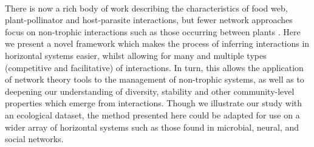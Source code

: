 \documentclass[a4,12pt]{article}
\begin{document}
    \paragraph{} 
    There is now a rich body of work describing the characteristics of food web, plant-pollinator and host-parasite interactions, but fewer network approaches focus on non-trophic interactions such as those occurring between plants \parencite{Ellison2019}. Here we present a novel framework which makes the process of inferring  interactions in horizontal systems easier, whilst allowing for many and multiple types (competitive and facilitative) of interactions. In turn, this allows the application of  network theory tools to the management of non-trophic systems, as well as to deepening our understanding of diversity, stability and other community-level properties which emerge from interactions. Though we illustrate our study with an ecological dataset, the method presented here could be adapted for use on a wider array of  horizontal systems such as those found in microbial, neural, and social networks. 

\end{document}
